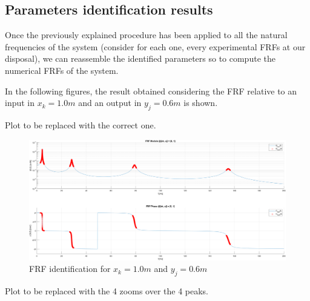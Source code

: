 \subsection{Parameters identification results}
\label{subsec:parameters_identification_results}

Once the previously explained procedure has been applied to all the natural frequencies of the system (consider for each one, every experimental FRFs at our disposal), we can reassemble the identified parameters so to compute the numerical FRFs of the system.

In the following figures, the result obtained considering the FRF relative to an input in $x_k = 1.0m$ and an output in $y_j = 0.6m$ is shown.

\begin{center}
    \huge{Plot to be replaced with the correct one.}
\end{center}

\begin{figure}[H]
    \centering
    \includegraphics[width=\textwidth]{img/MATLAB/Part_A/Comparison_FRF_couple_1_6.png}
    \caption{FRF identification for $x_k = 1.0m$ and $y_j = 0.6m$}
    \label{fig:FRF_identification}
\end{figure}

\begin{center}
    \huge{Plot to be replaced with the 4 zooms over the 4 peaks.}
\end{center}

